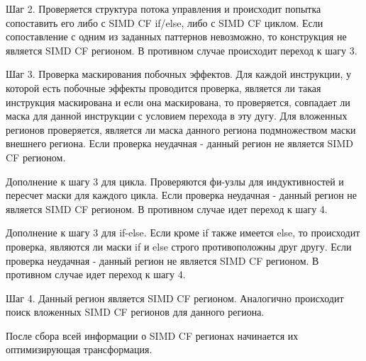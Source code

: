 Шаг 2. Проверяется структура потока управления и происходит попытка сопоставить
его либо с SIMD CF if/else, либо с SIMD CF циклом. Если сопоставление с одним из
заданных паттернов невозможно, то конструкция не является SIMD CF регионом. В
противном случае происходит переход к шагу 3.

Шаг 3. Проверка маскирования побочных эффектов. Для каждой инструкции, у которой
есть побочные эффекты проводится проверка, является ли такая инструкция
маскирована и если она маскирована, то проверяется, совпадает ли маска для
данной инструкции с условием перехода в эту дугу. Для вложенных регионов
проверяется, является ли маска данного региона подмножеством маски внешнего
региона. Если проверка неудачная - данный регион не является SIMD CF регионом.

Дополнение к шагу 3 для цикла. Проверяются фи-узлы для индуктивностей и пересчет
маски для каждого цикла. Если проверка неудачная - данный регион не является
SIMD CF регионом. В противном случае идет переход к шагу 4.

Дополнение к шагу 3 для if-else. Если кроме if также имеется else, то происходит
проверка, являются ли маски if и else строго противоположны друг другу. Если
проверка неудачная - данный регион не является SIMD CF регионом. В противном
случае идет переход к шагу 4.

Шаг 4. Данный регион является SIMD CF регионом. Аналогично происходит поиск
вложенных SIMD CF регионов для данного региона.

После сбора всей информации о SIMD CF регионах начинается их оптимизирующая
трансформация.

